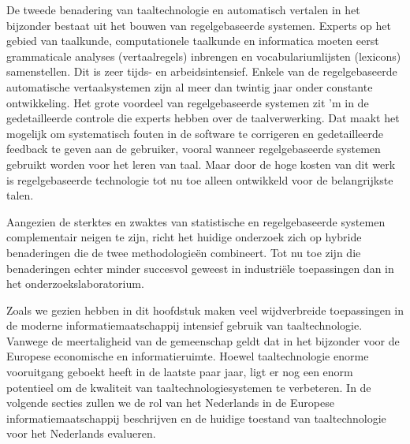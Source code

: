 \documentclass[]{../../metanetpaper}
\begin{document}
\begin{multicols}{2}
    De tweede benadering van taaltechnologie en automatisch vertalen in het bijzonder bestaat uit het bouwen van regelgebaseerde systemen. Experts op het gebied van taalkunde, computationele taalkunde en informatica moeten eerst grammaticale analyses (vertaalregels) inbrengen en vocabulariumlijsten (lexicons) samenstellen. Dit is zeer tijds- en arbeidsintensief. Enkele van de regelgebaseerde automatische vertaalsystemen zijn al meer dan twintig jaar onder constante ontwikkeling. Het grote voordeel van regelgebaseerde systemen zit 'm in de gedetailleerde controle die experts hebben over de taalverwerking. Dat maakt het mogelijk om systematisch fouten in de software te corrigeren en gedetailleerde feedback te geven aan de gebruiker, vooral wanneer regelgebaseerde systemen gebruikt worden voor het leren van taal. Maar door de hoge kosten van dit werk is regelgebaseerde technologie tot nu toe alleen ontwikkeld voor de belangrijkste talen.

    Aangezien de sterktes en zwaktes van statistische en regelgebaseerde systemen complementair neigen te zijn, richt het huidige onderzoek zich op hybride benaderingen die de twee methodologie{\"e}n combineert. Tot nu toe zijn die benaderingen echter minder succesvol geweest in industri{\"e}le toepassingen dan in het onderzoekslaboratorium.

    Zoals we gezien hebben in dit hoofdstuk maken veel wijdverbreide toepassingen in de moderne informatiemaatschappij intensief gebruik van taaltechnologie. Vanwege de meertaligheid van de gemeenschap geldt dat in het bijzonder voor de Europese economische en informatieruimte. Hoewel taaltechnologie enorme vooruitgang geboekt heeft in de laatste paar jaar, ligt er nog een enorm potentieel om de kwaliteit van taaltechnologiesystemen te verbeteren. In de volgende secties zullen we de rol van het Nederlands in de Europese informatiemaatschappij beschrijven en de huidige toestand van taaltechnologie voor het Nederlands evalueren.

\end{multicols}

\clearpage


\end{document}
